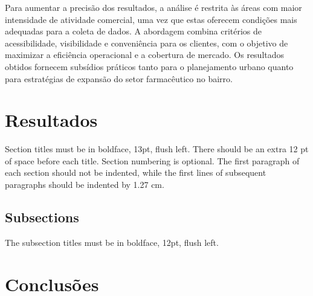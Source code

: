 \documentclass[12pt]{article}
\begin{document}
Para aumentar a precisão dos resultados, a análise é restrita às áreas com maior intensidade de atividade comercial, uma vez que estas oferecem condições mais adequadas para a coleta de dados. A abordagem combina critérios de acessibilidade, visibilidade e conveniência para os clientes, com o objetivo de maximizar a eficiência operacional e a cobertura de mercado. Os resultados obtidos fornecem subsídios práticos tanto para o planejamento urbano quanto para estratégias de expansão do setor farmacêutico no bairro.

\section{Resultados}

Section titles must be in boldface, 13pt, flush left. There should be an extra
12 pt of space before each title. Section numbering is optional. The first
paragraph of each section should not be indented, while the first lines of
subsequent paragraphs should be indented by 1.27 cm.

\subsection{Subsections}

The subsection titles must be in boldface, 12pt, flush left.

\section{Conclusões}\label{sec:figs}
\end{document}
